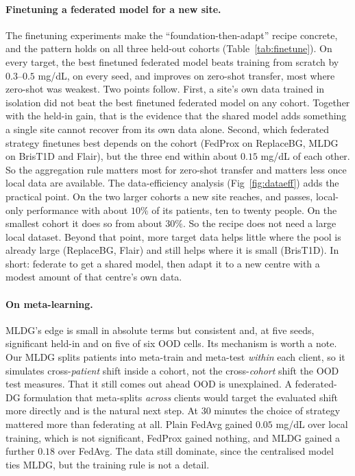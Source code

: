 \documentclass[10pt,letterpaper]{article}
\begin{document}
\paragraph{Finetuning a federated model for a new site.} The finetuning
experiments make the ``foundation-then-adapt'' recipe concrete, and the
pattern holds on all three held-out cohorts (Table~\ref{tab:finetune}). On
every target, the best finetuned federated model beats training from scratch
by $0.3$--$0.5$ mg/dL, on every seed, and improves on zero-shot transfer, most
where zero-shot was weakest. Two points follow. First, a site's own data
trained in isolation did not beat the best finetuned federated model on any
cohort. Together with the held-in gain, that is the evidence that the shared
model adds something a single site cannot recover from its own data alone.
Second, which federated strategy finetunes best depends on the cohort
(FedProx on ReplaceBG, MLDG on BrisT1D and Flair), but the three end within
about $0.15$ mg/dL of each other. So the aggregation rule matters most for
zero-shot transfer and matters less once local data are available. The
data-efficiency analysis (Fig~\ref{fig:dataeff}) adds the practical point.
On the two larger cohorts a new site reaches, and passes, local-only
performance with about $10\%$ of its patients, ten to twenty people. On the
smallest cohort it does so from about $30\%$. So the recipe does not need a
large local dataset. Beyond that point, more target data helps little where
the pool is already large (ReplaceBG, Flair) and still helps where it is
small (BrisT1D). In short: federate to get a shared model, then adapt it to
a new centre with a modest amount of that centre's own data.

\paragraph{On meta-learning.} MLDG's edge is small in absolute terms but
consistent and, at five seeds, significant held-in and on five of six OOD
cells. Its mechanism is worth a note. Our MLDG splits patients into
meta-train and meta-test \emph{within} each client, so it simulates
cross-\emph{patient} shift inside a cohort, not the cross-\emph{cohort} shift
the OOD test measures. That it still comes out ahead OOD is unexplained. A
federated-DG formulation that meta-splits \emph{across} clients would target
the evaluated shift more directly and is the natural next step. At 30
minutes the choice of strategy mattered more than federating at all. Plain
FedAvg gained $0.05$ mg/dL over local training, which is not significant,
FedProx gained nothing, and MLDG gained a further $0.18$ over FedAvg. The
data still dominate, since the centralised model ties MLDG, but the training
rule is not a detail.
\end{document}
